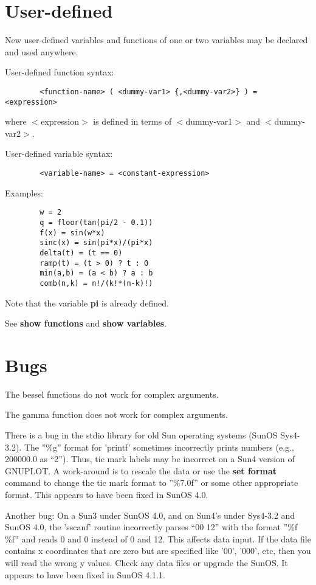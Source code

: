 \section{User-defined}
New user-defined variables and functions of one or two variables may be 
declared and used anywhere.

User-defined function syntax:
\begin{verbatim}
        <function-name> ( <dummy-var1> {,<dummy-var2>} ) =  <expression>
\end{verbatim}

where $<$expression$>$ is defined in terms of $<$dummy-var1$>$ and $<$dummy-var2$>$.

User-defined variable syntax:
\begin{verbatim}
        <variable-name> = <constant-expression>
\end{verbatim}

Examples:
\begin{verbatim}
        w = 2
        q = floor(tan(pi/2 - 0.1))
        f(x) = sin(w*x)
        sinc(x) = sin(pi*x)/(pi*x)
        delta(t) = (t == 0)
        ramp(t) = (t > 0) ? t : 0
        min(a,b) = (a < b) ? a : b
        comb(n,k) = n!/(k!*(n-k)!)
\end{verbatim}

Note that the variable {\bf pi} is already defined.

See {\bf show functions} and {\bf show variables}.
\section{Bugs}
The bessel functions do not work for complex arguments.

The gamma function does not work for complex arguments.

There is a bug in the stdio library for old Sun operating systems
(SunOS Sys4-3.2). The ''\%g'' format for 'printf' sometimes incorrectly
prints numbers (e.g., 200000.0 as ``2''). Thus, tic mark labels may be
incorrect on a Sun4 version of GNUPLOT. A work-around is to rescale
the data or use the {\bf set format} command to change the tic mark format
to ''\%7.0f'' or some other appropriate format. This appears to have been
fixed in SunOS 4.0.

Another bug: On a Sun3 under SunOS 4.0, and on Sun4's under Sys4-3.2
and SunOS 4.0, the 'sscanf' routine incorrectly parses ``00 12'' with
the format ''\%f \%f'' and reads 0 and 0 instead of 0 and 12. This
affects data input. If the data file contains x coordinates that are
zero but are specified like '00', '000', etc, then you will read the
wrong y values. Check any data files or upgrade the SunOS.
It appears to have been fixed in SunOS 4.1.1.

